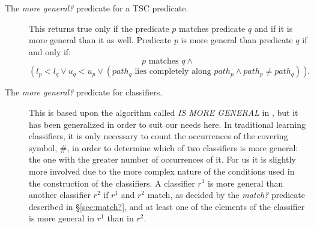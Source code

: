 \begin{description}
\item [The \emph{more general?} predicate for a TSC predicate.]
This returns true only if the predicate $p$ matches predicate $q$ and if it is more general than it as well.
Predicate $p$ is more general than predicate $q$ if and only if:
\[p \textrm{ matches } q \land\]
\[ \left( l_p < l_q \lor u_q < u_p \lor
      \left( path_q \textrm{ lies completely along } path_p \land path_p \neq path_q\right)
   \right)
.\]

\item [The \emph{more general?} predicate for classifiers.]
This is based upon the algorithm called \emph{IS MORE GENERAL} in \cite{ButzWilson}, but it has been generalized in order to suit our needs here.
In traditional learning classifiers, it is only necessary to count the occurrences of the covering symbol, $\#$, in order to determine which of two classifiers is more general: the one with the greater number of occurrences of it.
For us it is slightly more involved due to the more complex nature of the conditions used in the construction of the classifiers.
A classifier $r^1$ is more general than another classifier $r^2$ if $r^1$ and $r^2$ match,
as decided by the \emph{match?} predicate described in \S\ref{sec:match?},
and at least one of the elements of the classifier is more general in $r^1$ than in $r^2$.

\end{description}
